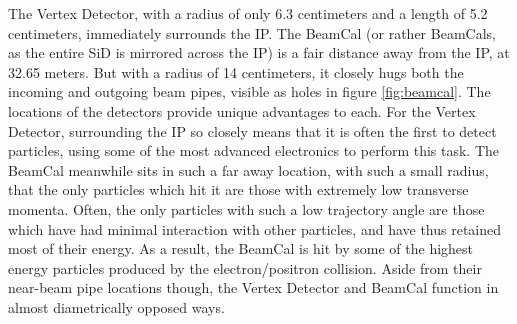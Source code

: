 \documentclass{report}
\begin{document}
                The Vertex Detector, with a radius of only 6.3 centimeters and a length of 5.2 centimeters, immediately surrounds the IP. The BeamCal (or rather BeamCals, as the entire SiD is mirrored across the IP) is a fair distance away from the IP, at 32.65 meters. But with a radius of 14 centimeters, it closely hugs both the incoming and outgoing beam pipes, visible as holes in figure \ref{fig:beamcal}. The locations of the detectors provide unique advantages to each. For the Vertex Detector, surrounding the IP so closely means that it is often the first to detect particles, using some of the most advanced electronics to perform this task. The BeamCal meanwhile sits in such a far away location, with such a small radius, that the only particles which hit it are those with extremely low transverse momenta. Often, the only particles with such a low trajectory angle are those which have had minimal interaction with other particles, and have thus retained most of their energy. As a result, the BeamCal is hit by some of the highest energy particles produced by the electron/positron collision. Aside from their near-beam pipe locations though, the Vertex Detector and BeamCal function in almost diametrically opposed ways.
\end{document}
